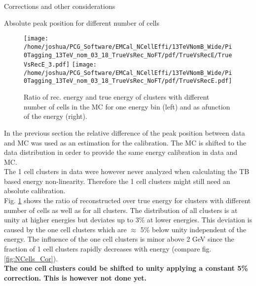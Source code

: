 \documentclass[ALICE]{ALICE_analysis_notes}
\begin{document}
\begin{section}{Corrections and other considerations}
\begin{subsubsection}{Absolute peak position for different number of cells}
	\begin{figure}[ht!]
		\centering
		\texttt{[image: /home/joshua/PCG\_Software/EMCal\_NCellEffi/13TeVNomB\_Wide/Pi0Tagging\_13TeV\_nom\_03\_18\_TrueVsRec\_NoFT/pdf/TrueVsRecE/TrueVsRecE\_3.pdf]}
		\texttt{[image: /home/joshua/PCG\_Software/EMCal\_NCellEffi/13TeVNomB\_Wide/Pi0Tagging\_13TeV\_nom\_03\_18\_TrueVsRec\_NoFT/pdf/TrueVsRecE.pdf]}
		\caption{ Ratio of rec. energy and true energy of clusters with different number of cells in the MC for one energy bin (left) and as afunction of the energy (right).}
		\label{fig:NonLin4}
	\end{figure}

 In the previous section the relative difference of the peak position between data and MC was used as an estimation for the calibration. The MC is shifted to the data distribution in order to provide the same energy calibration in data and MC. \\
 The 1 cell clusters in data were however never analyzed when calculating the TB based energy non-linearity. Therefore the 1 cell clusters might still need an absolute calibration. \\
 Fig. \ref{fig:NonLin4} shows the ratio of reconstructed over true energy for clusters with different number of cells as well as for all clusters. The distribution of all clusters is at unity at higher energies but deviates up to 3\% at lower energies. This deviation is caused by the one cell clusters which are $\approx$ 5\% below unity independent of the energy. The influence of the one cell clusters is minor above 2 GeV since the fraction of 1 cell clusters rapidly decreases with energy (compare fig. \ref{fig:NCells_Cor}).\\
 \textbf{The one cell clusters could be shifted to unity applying a constant 5\% correction. This is however not done yet.} 


\end{subsubsection}



\end{section}
\end{document}
